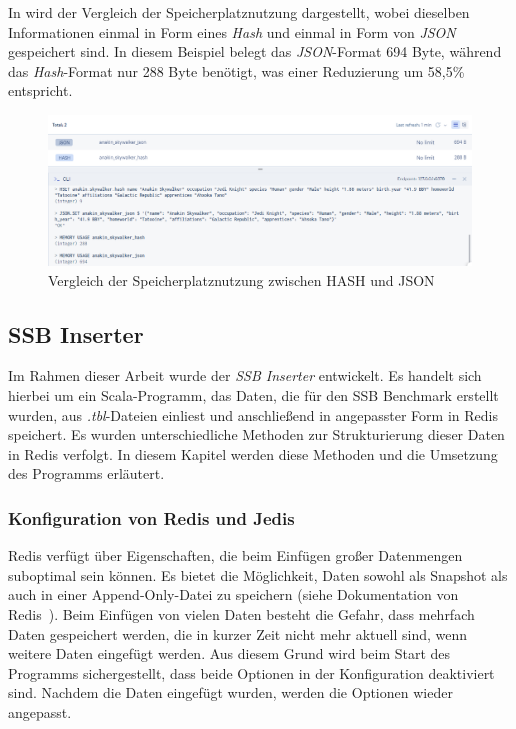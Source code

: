 In  wird der Vergleich der Speicherplatznutzung dargestellt, wobei dieselben Informationen einmal in Form eines \emph{Hash} und einmal in Form von \emph{JSON} gespeichert sind. In diesem Beispiel belegt das \emph{JSON}-Format 694 Byte, während das \emph{Hash}-Format nur 288 Byte benötigt, was einer Reduzierung um 58,5\% entspricht.
\begin{figure}[!h]  %
    \centering
    \includegraphics[width=1\textwidth]{pictures/redis/redis_hash_vs_json_memory.png}
    \caption{Vergleich der Speicherplatznutzung zwischen HASH und JSON}
    \label{pic:redis-hash-vs-json-memory}
\end{figure}

\subsection{SSB Inserter}\label{sec:ssb-inserter}
Im Rahmen dieser Arbeit wurde der \emph{SSB Inserter} entwickelt. Es handelt sich hierbei um ein Scala-Programm, das Daten, die für den SSB Benchmark erstellt wurden, aus \emph{.tbl}-Dateien einliest und anschließend in angepasster Form in Redis speichert. Es wurden unterschiedliche Methoden zur Strukturierung dieser Daten in Redis verfolgt. In diesem Kapitel werden diese Methoden und die Umsetzung des Programms erläutert.

\subsubsection{Konfiguration von Redis und Jedis}
Redis verfügt über Eigenschaften, die beim Einfügen großer Datenmengen suboptimal sein können.
Es bietet die Möglichkeit, Daten sowohl als Snapshot als auch in einer Append-Only-Datei zu speichern (siehe Dokumentation von Redis~\cite{redis_ltd_persistence_nodate}).
Beim Einfügen von vielen Daten besteht die Gefahr, dass mehrfach Daten gespeichert werden, die in kurzer Zeit nicht mehr aktuell sind, wenn weitere Daten eingefügt werden. Aus diesem Grund wird beim Start des Programms sichergestellt, dass beide Optionen in der Konfiguration deaktiviert sind. Nachdem die Daten eingefügt wurden, werden die Optionen wieder angepasst. 


